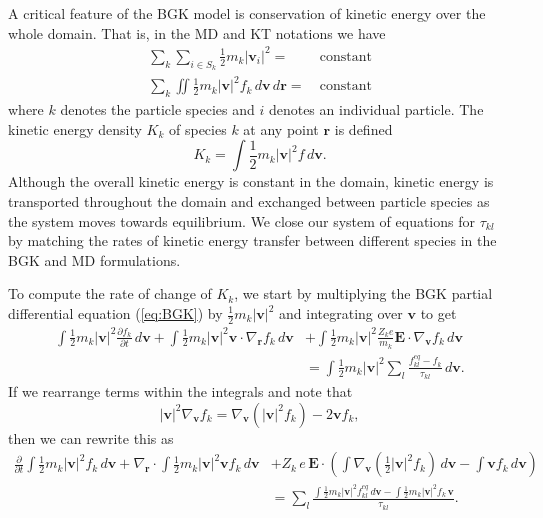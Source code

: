 \documentclass{article}
\begin{document}
A critical feature of the BGK model is conservation of kinetic energy over the whole domain. That is, in the MD and KT notations we have
\begin{align*}
\sum_k \sum_{i\in S_k} \frac{1}{2}m_k|\mathbf{v}_i|^2 =& \:\text{constant} \\
\sum_k \iint \frac{1}{2}m_k|\mathbf{v}|^2 f_k\,d\mathbf{v}\,d\mathbf{r} =& \:\text{constant}
\end{align*}
where $k$ denotes the particle species and $i$ denotes an individual particle. The kinetic energy density $K_k$ of species $k$ at any point $\mathbf{r}$ is defined
\begin{equation}
K_k = \int \frac{1}{2}m_k|\mathbf{v}|^2f\,d\mathbf{v}.
\end{equation}
Although the overall kinetic energy is constant in the domain, kinetic energy is transported throughout the domain and exchanged between particle species as the system moves towards equilibrium. We close our system of equations for $\tau_{kl}$ by matching the rates of kinetic energy transfer between different species in the BGK and MD formulations.

To compute the rate of change of $K_k$, we start by multiplying the BGK partial differential equation (\ref{eq:BGK}) by $\frac{1}{2}m_k|\mathbf{v}|^2$ and integrating over $\mathbf{v}$ to get
\begin{align*}
\int\frac{1}{2}m_k|\mathbf{v}|^2\frac{\partial f_k}{\partial t}\,d\mathbf{v} + \int\frac{1}{2}m_k|\mathbf{v}|^2\mathbf{v}\cdot\nabla_\mathbf{r}f_k\,d\mathbf{v} &+ \int\frac{1}{2}m_k|\mathbf{v}|^2\frac{Z_ke}{m_k}\mathbf{E}\cdot\nabla_\mathbf{v}f_k\,d\mathbf{v} \\
&= \int\frac{1}{2}m_k|\mathbf{v}|^2\sum_l\frac{f_{kl}^{eq}-f_k}{\tau_{kl}}\,d\mathbf{v}.
\end{align*}
If we rearrange terms within the integrals and note that
\begin{equation*}
|\mathbf{v}|^2\nabla_\mathbf{v}f_k=\nabla_\mathbf{v}(|\mathbf{v}|^2f_k)-2\mathbf{v}f_k,                                                         
\end{equation*}
then we can rewrite this as
\begin{align*}
\frac{\partial}{\partial t}\int\frac{1}{2}m_k|\mathbf{v}|^2f_k\,d\mathbf{v} + \nabla_\mathbf{r}\cdot\int\frac{1}{2}m_k|\mathbf{v}|^2\mathbf{v}f_k\,d\mathbf{v} &+
Z_k\,e\,\mathbf{E}\cdot\left(\int\nabla_\mathbf{v}\left(\frac{1}{2}|\mathbf{v}|^2f_k\right)\,d\mathbf{v} - \int\mathbf{v}f_k\,d\mathbf{v}\right) \\
&= \sum_l\frac{\int\frac{1}{2}m_k|\mathbf{v}|^2f_{kl}^{eq}\,d\mathbf{v} - \int\frac{1}{2}m_k|\mathbf{v}|^2f_k\,\mathbf{v}}{\tau_{kl}}.
\end{align*}
\end{document}

